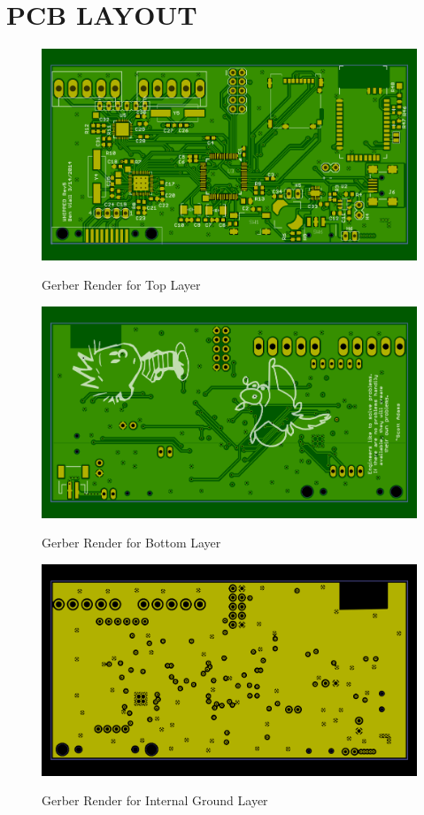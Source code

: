 \chapter{PCB LAYOUT}
\label{chap:PCB_LAYOUT}

\begin{figure}
\begin{center}
	\label{fig:TOPGerber}
	\includegraphics[angle=0,scale=1,width=.8\textwidth]{Images/Rev5_TOPGERB.png} 
	\caption{Gerber Render for Top Layer}
\end{center}
\end{figure}


\begin{figure}
\begin{center}
	\label{fig:BOTGerber}
	\includegraphics[angle=0,scale=1,width=.8\textwidth]{Images/Rev5_BOTGERB.png} 
	\caption{Gerber Render for Bottom Layer}
\end{center}
\end{figure}


\begin{figure}
\begin{center}
	\label{fig:GNDGerber}
	\includegraphics[angle=0,scale=1,width=.8\textwidth]{Images/Rev5_GNDGERB.png} 
	\caption{Gerber Render for Internal Ground Layer}
\end{center}
\end{figure}


